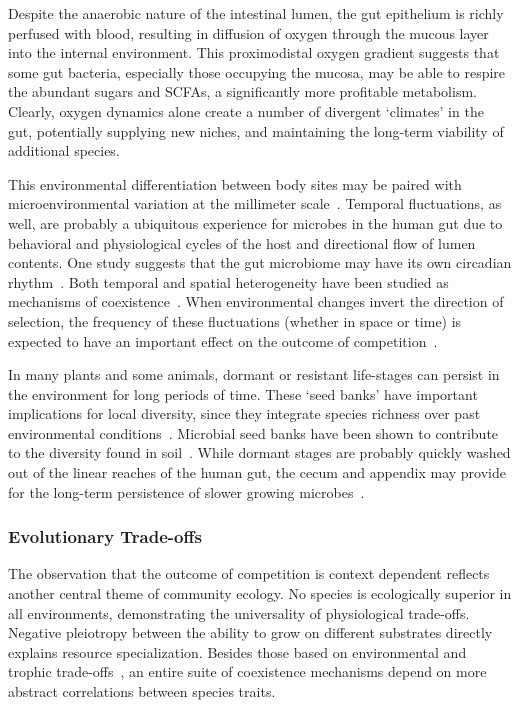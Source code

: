 \documentclass[12pt]{article}
\begin{document}
Despite the anaerobic nature of the intestinal lumen,
the gut epithelium is richly perfused with blood, resulting
in diffusion of oxygen through the mucous layer into
the internal environment.
This proximodistal oxygen gradient suggests that some
gut bacteria, especially those occupying the mucosa,
may be able to respire the abundant sugars and SCFAs,
a significantly more profitable metabolism.
Clearly, oxygen dynamics alone create a number of
divergent `climates' in the gut,
potentially supplying new niches,
and maintaining the long-term viability of additional
species.

This environmental differentiation between body sites may be
paired with microenvironmental variation at the millimeter
scale~\citep{TODO}.
Temporal fluctuations, as well, are probably a ubiquitous
experience for microbes in the human gut due to behavioral and physiological
cycles of the host and directional flow of lumen contents.
One study suggests that the gut microbiome may have
its own circadian rhythm~\citep{Thaiss2014}.
Both temporal and spatial heterogeneity have been studied as
mechanisms of coexistence~\citep{Chesson2000}.
When environmental changes invert the direction of selection,
the frequency of these fluctuations (whether in space or time)
is expected to have an important effect on the outcome of
competition~\citep{Hutchinson1961}.

In many plants and some animals, dormant or resistant life-stages can persist
in the environment for long periods of time.
These `seed banks' have important implications for local diversity,
since they integrate species richness
over past environmental conditions~\citep{TODO}.
Microbial seed banks have been shown to contribute to the diversity found in
soil~\citep{LennonTODO}.
While dormant stages are probably quickly washed out of the linear
reaches of the human gut,
the cecum and appendix may provide for the long-term persistence
of slower growing microbes~\citep{TODO}.

\subsubsection{Evolutionary Trade-offs}
The observation that the outcome of competition is context
dependent reflects another central theme of community ecology.
No species is ecologically superior in all environments,
demonstrating the universality of physiological trade-offs.
Negative pleiotropy between the ability to grow on
different substrates directly explains resource specialization.
Besides those based on environmental
and trophic trade-offs~\citep{Litchman2007},
an entire suite of coexistence mechanisms
depend on more abstract correlations between species traits.
\end{document}
